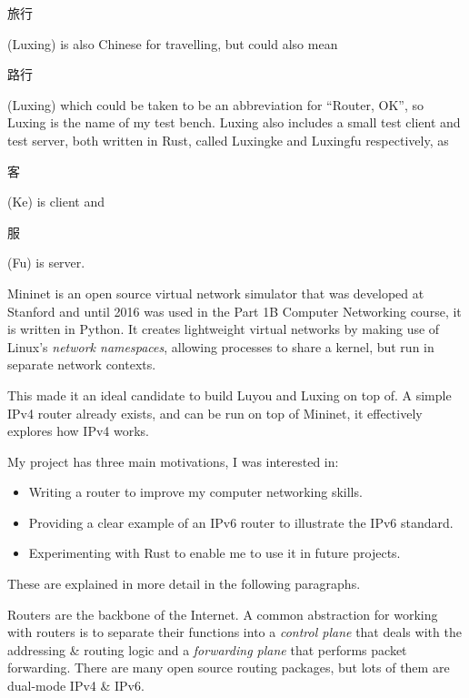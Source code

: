 \documentclass[12pt,a4paper,twoside,openany]{report}
\begin{document}
\begin{CJK}{UTF8}{gbsn}旅行\end{CJK} (Luxing) is also Chinese for travelling, but could also mean \begin{CJK}{UTF8}{gbsn}路行\end{CJK} (Luxing) which could be taken to be an abbreviation for ``Router, OK'', so Luxing is the name of my test bench. Luxing also includes a small test client and test server, both written in Rust\cite{rust}, called Luxingke and Luxingfu respectively, as \begin{CJK}{UTF8}{gbsn}客\end{CJK} (Ke) is client and \begin{CJK}{UTF8}{gbsn}服\end{CJK} (Fu) is server.

\bigskip

Mininet\cite{mininet} is an open source virtual network simulator that was developed at Stanford and until 2016 was used in the Part 1B Computer Networking course, it is written in Python.  It creates lightweight virtual networks by making use of Linux's \textit{network namespaces}, allowing processes to share a kernel, but run in separate network contexts. 

This made it an ideal candidate to build Luyou and Luxing on top of. A simple IPv4 router\cite{simple_router} already exists, and can be run on top of Mininet, it effectively explores how IPv4 works. 

\bigskip

My project has three main motivations, I was interested in:
\begin{itemize}
\item Writing a router to improve my computer networking skills.
\item Providing a clear example of an IPv6 router to illustrate the IPv6 standard.
\item Experimenting with Rust to enable me to use it in future projects.
\end{itemize}
These are explained in more detail in the following paragraphs.

\bigskip

Routers are the backbone of the Internet. A common abstraction for working with routers is to separate their functions into a \textit{control plane} that deals with the addressing \& routing logic and a \textit{forwarding plane} that performs packet forwarding. There are many open source routing packages\cite{open_source_routing}, but lots of them are dual-mode IPv4 \& IPv6. 
\end{document}
